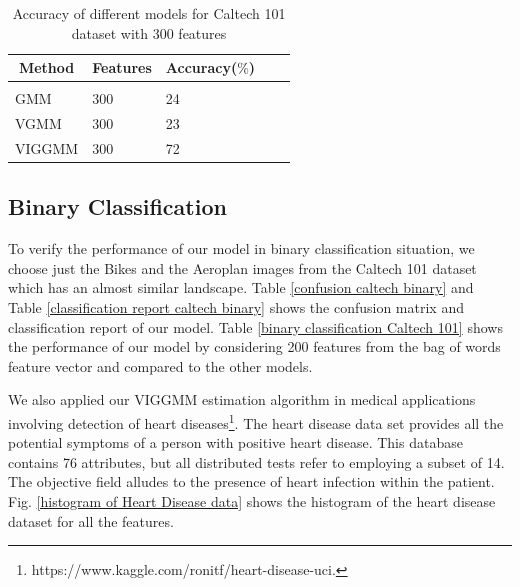 \documentclass[letterpaper]{article}
\begin{document}
\begin{table}[h]
    \caption{Accuracy of different models for Caltech 101 dataset with 300 features}
    \label{features 300 Caltech}
    \begin{center}
    \begin{tabular}{lllll}
    \multicolumn{1}{c}{\bf Method}  &\multicolumn{1}{c}{\bf Features} &\multicolumn{1}{c}{\bf Accuracy($\%$)}   \\
    \hline \\
    GMM         &300 &24 \\
    VGMM             &300  &23\\
    VIGGMM             &300  &72\\
    \end{tabular}
    \end{center}
    \end{table}


\subsection{Binary Classification}
To verify the performance of our model in binary classification situation, we choose just the Bikes and the Aeroplan images from the Caltech 101 dataset which has an almost similar landscape. 
Table \ref{confusion caltech binary} and Table \ref{classification report caltech binary} shows the confusion matrix and classification report of our model. 
Table \ref{binary classification Caltech 101} shows the performance of our model by considering 200 features from the bag of words feature vector and compared to the other
models. 

We also applied our VIGGMM estimation algorithm in medical applications involving
detection of heart diseases\footnote{https://www.kaggle.com/ronitf/heart-disease-uci.}. 
The heart disease data set provides all the potential symptoms of a person with positive heart disease. 
This database contains 76 attributes, but all distributed tests refer to employing a subset of 14. The objective field alludes to the presence of heart infection within the patient.
Fig. \ref{histogram of Heart Disease data} shows the histogram of the heart disease dataset for all the features. 
\end{document}
